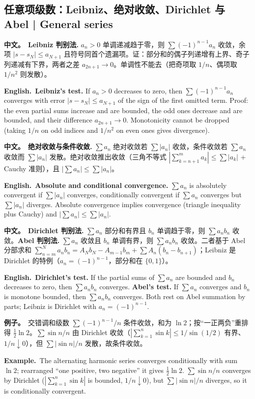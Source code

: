 \documentclass[UTF8,11pt,a4paper]{ctexart}
\newcommand{\BOTH}[2]{\par\noindent\textbf{中文。}\ #1\par\noindent\textbf{English.}\ #2\par}
\newcommand{\EX}[2]{\par\noindent\textbf{例子。}\ #1\par\noindent\textbf{Example.}\ #2\par}
\begin{document}
\subsection{任意项级数：Leibniz、绝对收敛、Dirichlet 与 Abel | General series}
\BOTH{\textbf{Leibniz 判别法.} $a_n>0$ 单调递减趋于零，则 $\sum(-1)^{n-1}a_n$ 收敛，余项 $|s-s_N|\le a_{N+1}$ 且符号同首个遗漏项。证：部分和的偶子列递增有上界、奇子列递减有下界，两者之差 $a_{2n+1}\to0$。单调性不能去（把奇项取 $1/n$、偶项取 $1/n^2$ 则发散）。}{\textbf{Leibniz's test.} If $a_n>0$ decreases to zero, then $\sum(-1)^{n-1}a_n$ converges with error $|s-s_N|\le a_{N+1}$ of the sign of the first omitted term. Proof: the even partial sums increase and are bounded, the odd ones decrease and are bounded, and their difference $a_{2n+1}\to0$. Monotonicity cannot be dropped (taking $1/n$ on odd indices and $1/n^2$ on even ones gives divergence).}
\BOTH{\textbf{绝对收敛与条件收敛.} $\sum a_n$ 绝对收敛若 $\sum|a_n|$ 收敛，条件收敛若 $\sum a_n$ 收敛而 $\sum|a_n|$ 发散。绝对收敛推出收敛（三角不等式 $|\sum_{k=n+1}^m a_k|\le\sum|a_k|$ + Cauchy 准则），且 $|\sum a_n|\le\sum|a_n|$。}{\textbf{Absolute and conditional convergence.} $\sum a_n$ is absolutely convergent if $\sum|a_n|$ converges, conditionally convergent if $\sum a_n$ converges but $\sum|a_n|$ diverges. Absolute convergence implies convergence (triangle inequality plus Cauchy) and $|\sum a_n|\le\sum|a_n|$.}
\BOTH{\textbf{Dirichlet 判别法.} $\sum a_n$ 部分和有界且 $b_n$ 单调趋于零，则 $\sum a_nb_n$ 收敛。\textbf{Abel 判别法.} $\sum a_n$ 收敛且 $b_n$ 单调有界，则 $\sum a_nb_n$ 收敛。二者基于 Abel 分部求和 $\sum_{n=m}^N a_nb_n=A_Nb_N-A_{m-1}b_m+\sum A_n(b_n-b_{n+1})$；Leibniz 是 Dirichlet 的特例（$a_n=(-1)^{n-1}$，部分和在 $\{0,1\}$）。}{\textbf{Dirichlet's test.} If the partial sums of $\sum a_n$ are bounded and $b_n$ decreases to zero, then $\sum a_nb_n$ converges. \textbf{Abel's test.} If $\sum a_n$ converges and $b_n$ is monotone bounded, then $\sum a_nb_n$ converges. Both rest on Abel summation by parts; Leibniz is Dirichlet with $a_n=(-1)^{n-1}$.}
\EX{交错调和级数 $\sum(-1)^{n-1}/n$ 条件收敛，和为 $\ln2$；按“一正两负”重排得 $\frac12\ln2$。$\sum\sin n/n$ 由 Dirichlet 收敛（$|\sum_{k=1}^n\sin k|\le1/\sin(1/2)$ 有界、$1/n\downarrow0$），但 $\sum|\sin n|/n$ 发散，故条件收敛。}{The alternating harmonic series converges conditionally with sum $\ln2$; rearranged “one positive, two negative” it gives $\frac12\ln2$. $\sum\sin n/n$ converges by Dirichlet ($|\sum_{k=1}^n\sin k|$ is bounded, $1/n\downarrow0$), but $\sum|\sin n|/n$ diverges, so it is conditionally convergent.}
\end{document}
